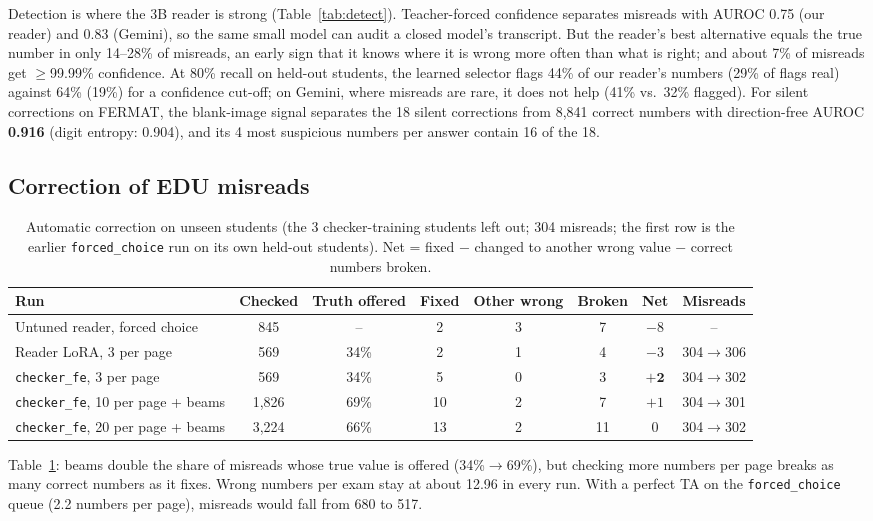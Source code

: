 \documentclass[11pt]{article}
\newcommand{\tool}[1]{\texttt{\small #1}}
\newcommand{\ra}{$\rightarrow$}
\begin{document}
Detection is where the 3B reader is strong (Table~\ref{tab:detect}). Teacher-forced confidence separates misreads with AUROC 0.75 (our reader) and 0.83 (Gemini), so the same small model can audit a closed model's transcript. But the reader's best alternative equals the true number in only 14--28\% of misreads, an early sign that it knows where it is wrong more often than what is right; and about 7\% of misreads get $\geq$99.99\% confidence. At 80\% recall on held-out students, the learned selector flags 44\% of our reader's numbers (29\% of flags real) against 64\% (19\%) for a confidence cut-off; on Gemini, where misreads are rare, it does not help (41\% vs.\ 32\% flagged). For silent corrections on FERMAT, the blank-image signal separates the 18 silent corrections from 8,841 correct numbers with direction-free AUROC \textbf{0.916} (digit entropy: 0.904), and its 4 most suspicious numbers per answer contain 16 of the 18.

\subsection{Correction of EDU misreads}

\begin{table}[t]
\centering\small
\begin{tabular}{@{}lccccccc@{}}
\toprule
Run & Checked & Truth offered & Fixed & Other wrong & Broken & Net & Misreads \\
\midrule
Untuned reader, forced choice & 845 & -- & 2 & 3 & 7 & $-8$ & -- \\
Reader LoRA, 3 per page & 569 & 34\% & 2 & 1 & 4 & $-3$ & 304\ra306 \\
\tool{checker\_fe}, 3 per page & 569 & 34\% & 5 & 0 & 3 & $\mathbf{+2}$ & 304\ra302 \\
\tool{checker\_fe}, 10 per page + beams & 1,826 & 69\% & 10 & 2 & 7 & $+1$ & 304\ra301 \\
\tool{checker\_fe}, 20 per page + beams & 3,224 & 66\% & 13 & 2 & 11 & $0$ & 304\ra302 \\
\bottomrule
\end{tabular}
\caption{Automatic correction on unseen students (the 3 checker-training students left out; 304 misreads; the first row is the earlier \tool{forced\_choice} run on its own held-out students). Net = fixed $-$ changed to another wrong value $-$ correct numbers broken.}
\label{tab:correct}
\end{table}

Table~\ref{tab:correct}: beams double the share of misreads whose true value is offered (34\%\ra69\%), but checking more numbers per page breaks as many correct numbers as it fixes. Wrong numbers per exam stay at about 12.96 in every run. With a perfect TA on the \tool{forced\_choice} queue (2.2 numbers per page), misreads would fall from 680 to 517.
\end{document}
